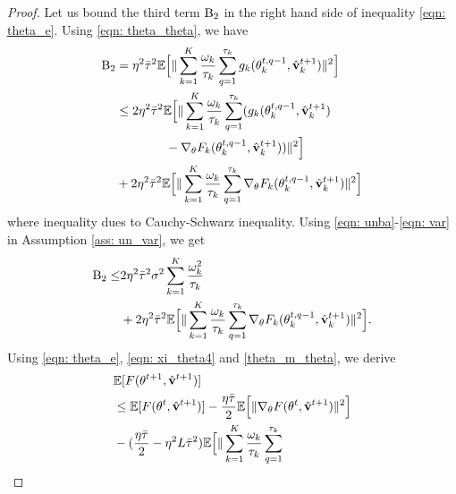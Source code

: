 \documentclass[twoside,journal]{IEEEtran}
\def\VectorFont{\bf}
\newcommand{\vv}{{\VectorFont v}}
\begin{document}
\begin{proof}
Let us bound the third term $\textmd{B}_2$ in the right hand side of inequality \eqref{eqn: theta_e}.
Using \eqref{eqn: theta_theta}, we have
\begin{align}\label{theta_m_theta11}
\nonumber \textmd{B}_2&=
\eta^2\bar{\tau}^2\mathbb{E}\Big[\| \sum_{k=1}^K\frac{\omega_k}{\tau_k}\sum_{q=1}^{\tau_k}
g_k(\theta_k^{t,q-1},\hat{\vv}_{k}^{t+1})\|^2\Big]\\
\nonumber&\leq 2\eta^2\bar{\tau}^2\mathbb{E}\Big[\|\sum_{k=1}^K\frac{\omega_k}{\tau_k}\sum_{q=1}^{\tau_k}
(g_k(\theta_k^{t,q-1},\hat{\vv}_{k}^{t+1})\\
\nonumber&\qquad\qquad-
\nabla_{\theta}F_k(\theta_k^{t,q-1},\hat{\vv}_{k}^{t+1}))\|^2\Big]\\
&+
2\eta^2\bar{\tau}^2\mathbb{E}\Big[\|\sum_{k=1}^K\frac{\omega_k}{\tau_k}\sum_{q=1}^{\tau_k}
\nabla_{\theta}F_k(\theta_k^{t,q-1},\hat{\vv}_{k}^{t+1})\|^2\Big]
\end{align}
where inequality dues to Cauchy-Schwarz inequality. Using \eqref{eqn: unba}-\eqref{eqn: var} in Assumption \eqref{ass: un_var}, we get
\begin{align}\label{theta_m_theta}
\nonumber\textmd{B}_2\leq & 2\eta^2\bar{\tau}^2\sigma^2\sum_{k=1}^K\frac{\omega_k^2}{\tau_k}\\
&+2\eta^2\bar{\tau}^2\mathbb{E}\Big[\|\sum_{k=1}^K\frac{\omega_k}{\tau_k}\sum_{q=1}^{\tau_k}
\nabla_{\theta}F_k(\theta_k^{t,q-1},\hat{\vv}_{k}^{t+1})\|^2\Big].
\end{align}
Using \eqref{eqn: theta_e}, \eqref{eqn: xi_theta4} and \eqref{theta_m_theta}, we derive
\begin{align}
\nonumber&\mathbb{E}[F(\theta^{t+1},\hat{\vv}^{t+1})]\\
\nonumber&\leq \mathbb{E}[F(\theta^{t},\hat{\vv}^{t+1})]
-\frac{\eta\bar{\tau} }{2}\mathbb{E}\Big[\|\nabla_{\theta}F(\theta^t,\hat{\vv}^{t+1})\|^2\Big]
\\
\nonumber&-(\frac{\eta\bar{\tau}}{2}-\eta^2L\bar{\tau}^2)\mathbb{E}\Big[\|\sum_{k=1}^K\frac{\omega_k}{\tau_k}\sum_{q=1}^{\tau_k}

\end{align}
\end{proof}
\end{document}

